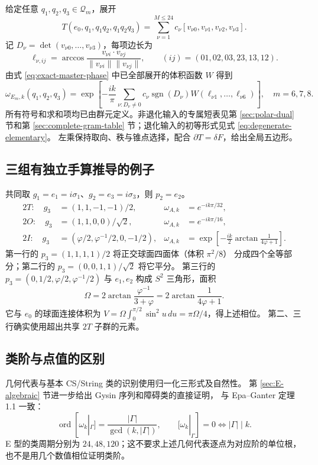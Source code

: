 给定任意 $q_1,q_2,q_3\in\mathcal Q_m$，展开
\[
T(e_0,q_1,q_1q_2,q_1q_2q_3)
=\sum_{\nu=1}^{M\le24}c_\nu[v_{\nu0},v_{\nu1},v_{\nu2},v_{\nu3}].
\]
记 $D_\nu=\det(v_{\nu0},\ldots,v_{\nu3})$，每项边长为
\[
\ell_{\nu,ij}=\arccos\frac{v_{\nu i}\cdot v_{\nu j}}
{\|v_{\nu i}\|\|v_{\nu j}\|},\qquad
(ij)=(01,02,03,23,13,12).
\]
由式 \eqref{eq:exact-master-phase} 中已全部展开的体积函数 $W$ 得到
\begin{equation}
\boxed{\omega_{E_m,k}(q_1,q_2,q_3)=
\exp\!\left[-\frac{ik}{\pi}\sum_{\nu:D_\nu\ne0}
c_\nu\operatorname{sgn}(D_\nu)W(\ell_{\nu1},\ldots,\ell_{\nu6})\right],
\quad m=6,7,8.}
\end{equation}
所有符号和求和项均已由群元定义。非退化输入的专属短表见第 \ref{sec:polar-dual} 节和第 \ref{sec:complete-gram-table} 节；退化输入的初等形式见式 \eqref{eq:degenerate-elementary}。
左乘保持取向、秩与锥点选择，配合 $\partial T=\delta F$，给出全局五边形。

\subsection{三组有独立手算推导的例子}
共同取 $g_1=e_1=i\sigma_1$、$g_2=e_3=i\sigma_3$，则 $p_2=e_2$。
\begin{align*}
2T:\quad g_3&=(1,1,-1,-1)/2,& \omega_{A,k}&=e^{-ik\pi/32},\\
2O:\quad g_3&=(1,1,0,0)/\sqrt2,& \omega_{A,k}&=e^{-ik\pi/16},\\
2I:\quad g_3&=(\varphi/2,\varphi^{-1}/2,0,-1/2),&
\omega_{A,k}&=\exp\!\left[-\frac{ik}{2}\arctan\frac1{4\varphi+1}\right].
\end{align*}
第一行的 $p_3=(1,1,1,1)/2$ 将正交球面四面体（体积 $\pi^2/8$）
分成四个全等部分；第二行的 $p_3=(0,0,1,1)/\sqrt2$ 将它平分。
第三行的 $p_3=(0,1/2,\varphi/2,\varphi^{-1}/2)$ 与 $e_1,e_2$ 构成 $S^2$ 三角形，面积
\[
\Omega=2\arctan\frac{\varphi^{-1}}{3+\varphi}
=2\arctan\frac1{4\varphi+1}.
\]
它与 $e_0$ 的球面连接体积为
$V=\Omega\int_0^{\pi/2}\sin^2u\,du=\pi\Omega/4$，得上述相位。
第二、三行确实使用超出共享 $2T$ 子群的元素。

\subsection{类阶与点值的区别}
几何代表与基本 CS/String 类的识别使用归一化三形式及自然性。
第 \ref{sec:E-algebraic} 节进一步给出 Gysin 序列和障碍类的直接证明，
与 Epa--Ganter 定理 1.1\cite{epa} 一致：
\[
\operatorname{ord}[\omega_k|_\Gamma]=\frac{|\Gamma|}{\gcd(k,|\Gamma|)},
\qquad [\omega_k|_\Gamma]=0\iff |\Gamma|\mid k.
\]
E 型的类周期分别为 $24,48,120$；这不要求上述几何代表逐点为对应阶的单位根，
也不是用几个数值相位证明类阶。
